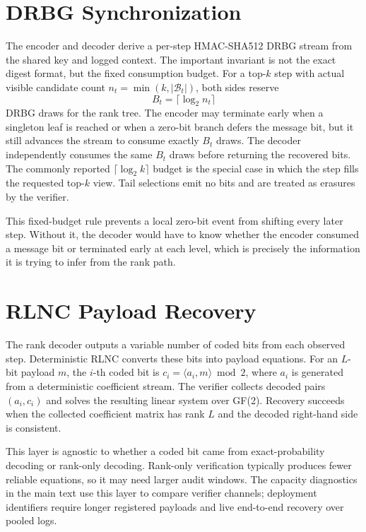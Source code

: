 \documentclass[conference,compsoc]{IEEEtran}
\newcommand{\B}{\mathcal{B}}
\begin{document}
\section{DRBG Synchronization}
\label{app:drbg-sync}

The encoder and decoder derive a per-step HMAC-SHA512 DRBG stream from the shared key and logged context. The important invariant is not the exact digest format, but the fixed consumption budget. For a top-$k$ step with actual visible candidate count $n_t=\min(k,|\B_t|)$, both sides reserve
\[
  B_t=\lceil\log_2 n_t\rceil
\]
DRBG draws for the rank tree. The encoder may terminate early when a singleton leaf is reached or when a zero-bit branch defers the message bit, but it still advances the stream to consume exactly $B_t$ draws. The decoder independently consumes the same $B_t$ draws before returning the recovered bits. The commonly reported $\lceil\log_2 k\rceil$ budget is the special case in which the step fills the requested top-$k$ view. Tail selections emit no bits and are treated as erasures by the verifier.

This fixed-budget rule prevents a local zero-bit event from shifting every later step. Without it, the decoder would have to know whether the encoder consumed a message bit or terminated early at each level, which is precisely the information it is trying to infer from the rank path.

\section{RLNC Payload Recovery}
\label{app:rlnc}

The rank decoder outputs a variable number of coded bits from each observed step. Deterministic RLNC converts these bits into payload equations. For an $L$-bit payload $m$, the $i$-th coded bit is $c_i=\langle a_i,m\rangle\bmod 2$, where $a_i$ is generated from a deterministic coefficient stream. The verifier collects decoded pairs $(a_i,c_i)$ and solves the resulting linear system over GF(2). Recovery succeeds when the collected coefficient matrix has rank $L$ and the decoded right-hand side is consistent.

This layer is agnostic to whether a coded bit came from exact-probability decoding or rank-only decoding. Rank-only verification typically produces fewer reliable equations, so it may need larger audit windows. The capacity diagnostics in the main text use this layer to compare verifier channels; deployment identifiers require longer registered payloads and live end-to-end recovery over pooled logs.
\end{document}
